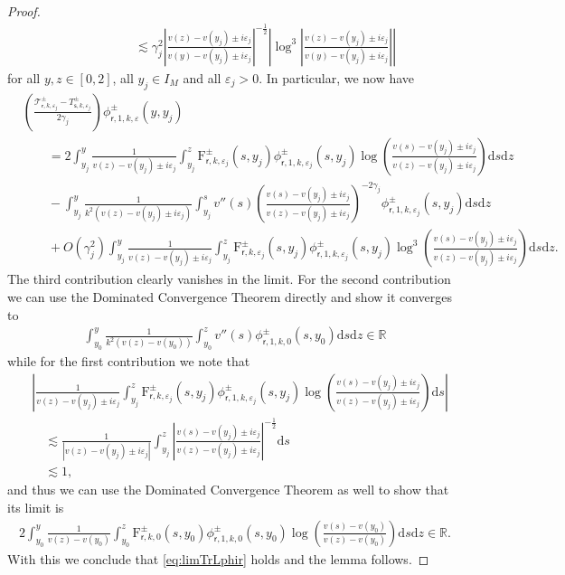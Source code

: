 \documentclass[11pt,reqno]{amsproc}
\theoremstyle{definition}
\numberwithin{equation}{section}
\newcommand{\R}{{\mathbb R}}
\newcommand{\sr}{{\mathsf{r}}}
\newcommand{\s}{{\mathsf{s}}}
\newcommand{\cT}{{\mathcal T}}
\renewcommand{\d}{\mathrm{d}}
\newcommand{\ep}{\varepsilon}
\begin{document}
\begin{proof}
\begin{align*}
&\qquad\qquad\lesssim \gamma_j^2 \left|  \frac{v(z) - v(y_j) \pm i\ep_j}{v(y) - v(y_j) \pm i\ep_j} \right|^{-\frac12}  \left| \log^3 \left|  \frac{v(z) - v(y_j) \pm i\ep_j}{v(y) - v(y_j) \pm i\ep_j} \right| \right| 
\end{align*}
for all $y,z\in[0,2]$, all $y_j\in I_M$ and all $\ep_j>0$. In particular, we now have
\begin{align*}
&\left(\frac{\cT_{\sr,k,\ep_j}^\pm-T_{\s,k,\ep_j}^\pm}{2\gamma_j} \right)\phi_{\sr,1,k,\ep}^\pm(y,y_j) \\
&\qquad= 2\int_{y_j}^y \frac{1}{v(z) - v(y_j) \pm i\ep_j}\int_{y_j}^z \mathrm{F}_{\sr,k,\ep_j}^\pm(s,y_j)\phi_{\sr,1,k,\ep_j}^\pm(s,y_j) \log \left( \frac{v(s) - v(y_j) \pm i\ep_j}{v(z) - v(y_j) \pm i\ep_j} \right) \d s \d z \\
&\qquad -\int_{y_j}^y \frac{1}{k^2(v(z) - v(y_j) \pm i\ep_j)}\int_{y_j}^s v''(s) \left( \frac{v(s) - v(y_j) \pm i\ep_j}{v(z) - v(y_j) \pm i\ep_j} \right)^{-2\gamma_j}\phi_{\sr,1,k,\ep_j}^\pm(s,y_j) \d s \d z \\
&\qquad + O(\gamma_j^2) \int_{y_j}^y \frac{1}{v(z) - v(y_j) \pm i\ep_j}\int_{y_j}^z \mathrm{F}_{\sr,k,\ep_j}^\pm(s,y_j)\phi_{\sr,1,k,\ep_j}^\pm(s,y_j) \log^3 \left( \frac{v(s) - v(y_j) \pm i\ep_j}{v(z) - v(y_j) \pm i\ep_j} \right) \d s \d z. 
\end{align*}
The third contribution clearly vanishes in the limit. For the second contribution we can use the Dominated Convergence Theorem directly and show it converges to
\begin{align*}
\int_{y_0}^y \frac{1}{k^2(v(z) - v(y_0))}\int_{y_0}^z v''(s) \phi_{\sr,1,k,0}^\pm(s,y_0) \d s \d z \in \R
\end{align*}
while for the first contribution we note that
\begin{align*}
&\left| \frac{1}{v(z) - v(y_j) \pm i\ep_j}\int_{y_j}^z \mathrm{F}_{\sr,k,\ep_j}^\pm(s,y_j)\phi_{\sr,1,k,\ep_j}^\pm(s,y_j) \log \left( \frac{v(s) - v(y_j) \pm i\ep_j}{v(z) - v(y_j) \pm i\ep_j} \right) \d s \right| \\
&\quad\lesssim \frac{1}{|v(z) - v(y_j) \pm i\ep_j|}\int_{y_j}^z \left| \frac{v(s) - v(y_j) \pm i\ep_j}{v(z) - v(y_j) \pm i\ep_j} \right|^{-\frac12} \d s \\
&\quad \lesssim 1,
\end{align*}
and thus we can use the Dominated Convergence Theorem as well to show that its limit is
\begin{align*}
2\int_{y_0}^y \frac{1}{v(z) - v(y_0) }\int_{y_0}^z \mathrm{F}_{\sr,k,0}^\pm(s,y_0)\phi_{\sr,1,k,0}^\pm(s,y_0) \log \left( \frac{v(s) - v(y_0)}{v(z) - v(y_0) } \right) \d s \d z \in \R.
\end{align*}
With this we conclude that \eqref{eq:limTrLphir} holds and the lemma follows.
\end{proof}
\end{document}
